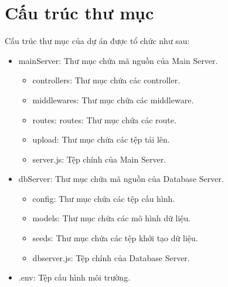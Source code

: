     \section{Cấu trúc thư mục}
        \hspace*{0.6cm}Cấu trúc thư mục của dự án được tổ chức như sau:
        \begin{itemize}
            \item mainServer: Thư mục chứa mã nguồn của Main Server.
            \begin{itemize} 
                \item controllers: Thư mục chứa các controller.
                \item middlewares: Thư mục chứa các middleware.
                \item routes: routes: Thư mục chứa các route.
                \item upload: Thư mục chứa các tệp tải lên.
                \item server.js: Tệp chính của Main Server.
            \end{itemize}
            \item dbServer: Thư mục chứa mã nguồn của Database Server.
            \begin{itemize}
                \item config: Thư mục chứa các tệp cấu hình.
                \item models: Thư mục chứa các mô hình dữ liệu.
                \item seeds: Thư mục chứa các tệp khởi tạo dữ liệu.
                \item dbserver.js: Tệp chính của Database Server.
            \end{itemize}
            \item .env: Tệp cấu hình môi trường.
        \end{itemize}
